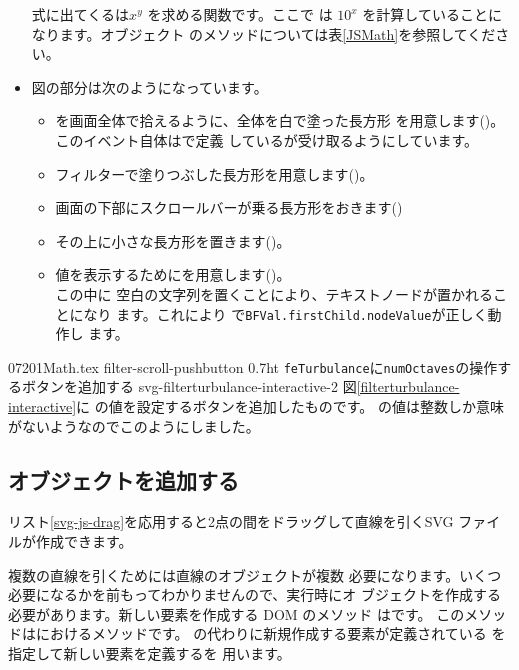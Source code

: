 \begin{itemize}
       式に出てくるは$x^y$ を求める関数です。ここで
       は $10^{x}$ を計算していることになります。オブジェクト
       のメソッドについては表\ref{JSMath}を参照してください。
 \item 図の部分は次のようになっています。
\begin{itemize}
 \item {}を画面全体で拾えるように、全体を白で塗った長方形
       を用意します()。このイベント自体はで定義
       しているが受け取るようにしています。
 \item フィルターで塗りつぶした長方形を用意します()。
 \item 画面の下部にスクロールバーが乗る長方形をおきます()
 \item その上に小さな長方形を置きます()。
 \item 値を表示するためにを用意します()。\\
       この中に
       空白の文字列を置くことにより、テキストノードが置かれることになり
       ます。これにより
       で\texttt{BFVal.firstChild.nodeValue}が正しく動作し
       ます。
\end{itemize}
\end{itemize}
 \CH07201Math.tex
\ProbwithFigSol%
{filter-scroll-pushbutton}
{0.7}{ht}
{\texttt{feTurbulance}に\texttt{numOctaves}の操作するボタンを追加する}
{svg-filterturbulance-interactive-2}
{図\ref{filterturbulance-interactive}に
の値を設定するボタンを追加したものです。
の値は整数しか意味がないようなのでこのようにしました。
}
\subsection{オブジェクトを追加する}
リスト\ref{svg-js-drag}を応用すると2点の間をドラッグして直線を引くSVG
ファイルが作成できます。

複数の直線を引くためには直線のオブジェクトが複数
必要になります。いくつ必要になるかを前もってわかりませんので、実行時にオ
ブジェクトを作成する必要があります。新しい要素を作成する DOM のメソッド
はです。
このメソッドはにおけるメソッドです。
の代わりに新規作成する要素が定義されている
を指定して新しい要素を定義するを
用います。

